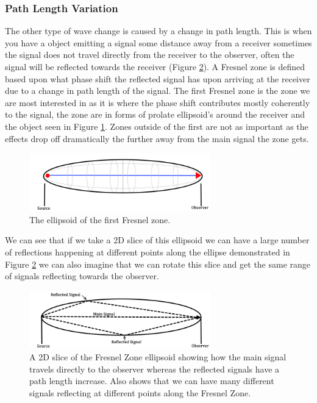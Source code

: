 \documentclass[10pt,a4paper]{article}
\begin{document}
\subsubsection{Path Length Variation}\label{plen}
The other type of wave change is caused by a change in path length. This is when you have a object emitting a signal some distance away from a receiver sometimes the signal does not travel directly from the receiver to the observer, often the signal will be reflected towards the receiver (Figure \ref{slic}). A Fresnel zone is defined based upon what phase shift the reflected signal has upon arriving at the receiver due to a change in path length of the signal. The first Fresnel zone is the zone we are most interested in as it is where the phase shift contributes mostly coherently to the signal, the zone are in forms of prolate ellipsoid's around the receiver and the object seen in Figure \ref{elips}. Zones outside of the first are not as important as the effects drop off dramatically the further away from the main signal the zone gets.
\begin{figure}[H]
\centering 
\includegraphics[width=0.7\textwidth]{Fres_elips}
\caption{The ellipsoid of the first Fresnel zone.}
\label{elips}
\end{figure}
We can see that if we take a 2D slice of this ellipsoid we can have a large number of reflections happening at different points along the ellipse demonstrated in Figure \ref{slic} we can also imagine that we can rotate this slice and get the same range of signals reflecting towards the observer.
\begin{figure}[H]
\centering 
\includegraphics[width=0.7\textwidth]{Fres_slice}
\caption{A 2D slice of the Fresnel Zone ellipsoid showing how the main signal travels directly to the observer whereas the reflected signals have a path length increase. Also shows that we can have many different signals reflecting at different points along the Fresnel Zone.}
\label{slic}
\end{figure}
\end{document}
